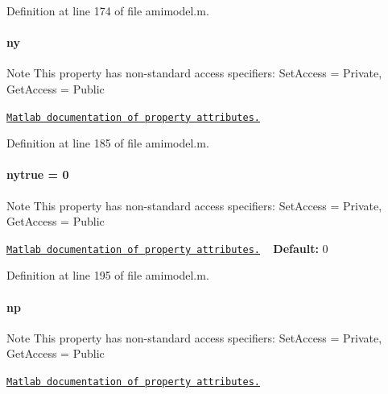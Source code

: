 Definition at line 174 of file amimodel.\+m.

\hypertarget{classamimodel_a289ca425eb368f1d582b6be2be0d3dfc}{}
\paragraph[{ny}]{\setlength{\rightskip}{0pt plus 5cm}ny}\label{classamimodel_a289ca425eb368f1d582b6be2be0d3dfc}
\begin{DoxyNote}{Note}
This property has non-\/standard access specifiers\+: {\ttfamily Set\+Access = Private, Get\+Access = Public} 

\href{http://www.mathworks.com/help/matlab/matlab_oop/property-attributes.html}{\tt Matlab documentation of property attributes.} 
\end{DoxyNote}


Definition at line 185 of file amimodel.\+m.

\hypertarget{classamimodel_ac91d7b36031ec122abc9f739692b02e8}{}
\paragraph[{nytrue}]{\setlength{\rightskip}{0pt plus 5cm}nytrue = 0}\label{classamimodel_ac91d7b36031ec122abc9f739692b02e8}
\begin{DoxyNote}{Note}
This property has non-\/standard access specifiers\+: {\ttfamily Set\+Access = Private, Get\+Access = Public} 

\href{http://www.mathworks.com/help/matlab/matlab_oop/property-attributes.html}{\tt Matlab documentation of property attributes.} ~\newline
{\bfseries Default\+:} 0 
\end{DoxyNote}


Definition at line 195 of file amimodel.\+m.

\hypertarget{classamimodel_a6f6e2fe71b05c4c2f2d967ce9ca02dfd}{}
\paragraph[{np}]{\setlength{\rightskip}{0pt plus 5cm}np}\label{classamimodel_a6f6e2fe71b05c4c2f2d967ce9ca02dfd}
\begin{DoxyNote}{Note}
This property has non-\/standard access specifiers\+: {\ttfamily Set\+Access = Private, Get\+Access = Public} 

\href{http://www.mathworks.com/help/matlab/matlab_oop/property-attributes.html}{\tt Matlab documentation of property attributes.} 
\end{DoxyNote}


